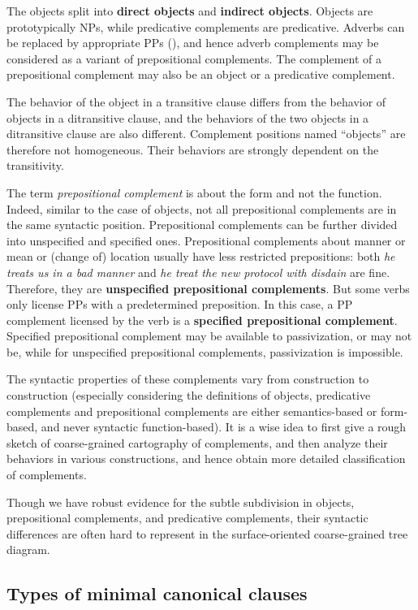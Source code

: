 \documentclass{article}
\newcommand*{\concept}[1]{\textbf{#1}}
\newcommand*{\term}[1]{\emph{#1}}
\newcommand*{\corpus}[1]{\emph{#1}}
\begin{document}
The objects split into \concept{direct objects} and \concept{indirect objects}.
Objects are prototypically NPs, 
while predicative complements are predicative.
Adverbs can be replaced by appropriate PPs (), %
and hence adverb complements may be considered as a variant of prepositional complements.
The complement of a prepositional complement may also be an object or a predicative complement.

The behavior of the object in a transitive clause differs from 
the behavior of objects in a ditransitive clause,
and the behaviors of the two objects in a ditransitive clause are also different.
Complement positions named ``objects'' are therefore not homogeneous.
Their behaviors are strongly dependent on the transitivity.

The term \term{prepositional complement} is about the form and not the function.
Indeed, similar to the case of objects,
not all prepositional complements are in the same syntactic position.
Prepositional complements can be further divided into unspecified and specified ones.
Prepositional complements about manner or mean or (change of) location usually have less restricted prepositions:
both \corpus{he treats us in a bad manner} and \corpus{he treat the new protocol with disdain} are fine.
Therefore, they are \concept{unspecified prepositional complements}.
But some verbs only license PPs with a predetermined preposition.
In this case, a PP complement licensed by the verb is a \concept{specified prepositional complement}.
Specified prepositional complement may be available to passivization, 
or may not be,
while for unspecified prepositional complements, passivization is impossible. %

The syntactic properties of these complements vary from construction to construction
(especially considering the definitions of objects, predicative complements and prepositional complements 
are either semantics-based or form-based, and never syntactic function-based).
It is a wise idea to first give a rough sketch of coarse-grained cartography of complements,
and then analyze their behaviors in various constructions, 
and hence obtain more detailed classification of complements.

Though we have robust evidence for the subtle subdivision 
in objects, prepositional complements, and predicative complements, 
their syntactic differences are often hard to represent in the surface-oriented coarse-grained tree diagram.

\subsection{Types of minimal canonical clauses}\label{sec:minimal-canonical-clause}
\end{document}
